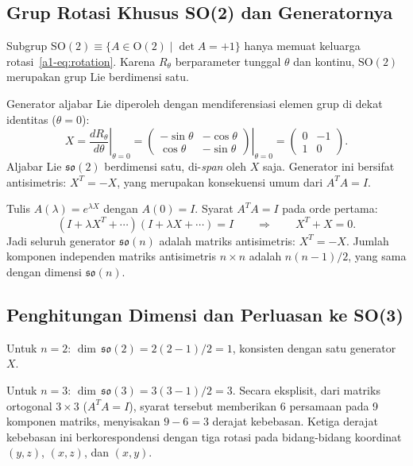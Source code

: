 \subsection{Grup Rotasi Khusus SO(2) dan Generatornya}

Subgrup $\mathrm{SO}(2) \equiv \{A \in \mathrm{O}(2) \mid \det A = +1\}$ hanya memuat keluarga rotasi~\eqref{a1-eq:rotation}. Karena $R_\theta$ berparameter tunggal $\theta$ dan kontinu, $\mathrm{SO}(2)$ merupakan grup Lie berdimensi satu.

\vspace{0.5em}
Generator aljabar Lie diperoleh dengan mendiferensiasi elemen grup di dekat identitas ($\theta = 0$):
\begin{equation}\label{a1-eq:generator-so2}
    X = \left.\frac{dR_\theta}{d\theta}\right|_{\theta = 0}
    = \left.\begin{pmatrix}-\sin\theta & -\cos\theta \\ \cos\theta & -\sin\theta\end{pmatrix}\right|_{\theta = 0}
    = \begin{pmatrix}0 & -1 \\ 1 & 0\end{pmatrix}.
\end{equation}
Aljabar Lie $\mathfrak{so}(2)$ berdimensi satu, di-\emph{span} oleh $X$ saja. Generator ini bersifat antisimetris: $X^T = -X$, yang merupakan konsekuensi umum dari $A^T A = I$.

\vspace{0.5em}
Tulis $A(\lambda) = e^{\lambda X}$ dengan $A(0) = I$. Syarat $A^T A = I$ pada orde pertama:
\begin{equation}
    (I + \lambda X^T + \cdots)(I + \lambda X + \cdots) = I
    \qquad\Longrightarrow\qquad
    X^T + X = 0.
\end{equation}
Jadi seluruh generator $\mathfrak{so}(n)$ adalah matriks antisimetris: $X^T = -X$. Jumlah komponen independen matriks antisimetris $n \times n$ adalah $n(n-1)/2$, yang sama dengan dimensi $\mathfrak{so}(n)$.

\subsection{Penghitungan Dimensi dan Perluasan ke SO(3)}

Untuk $n = 2$: $\dim\,\mathfrak{so}(2) = 2(2-1)/2 = 1$, konsisten dengan satu generator $X$.

Untuk $n = 3$: $\dim\,\mathfrak{so}(3) = 3(3-1)/2 = 3$. Secara eksplisit, dari matriks ortogonal $3 \times 3$ ($A^T A = I$), syarat tersebut memberikan 6 persamaan pada 9 komponen matriks, menyisakan $9 - 6 = 3$ derajat kebebasan. Ketiga derajat kebebasan ini berkorespondensi dengan tiga rotasi pada bidang-bidang koordinat $(y,z)$, $(x,z)$, dan $(x,y)$.

